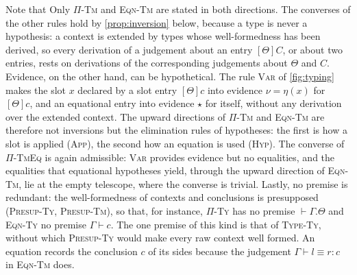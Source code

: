 Note that Only \textsc{$\Pi$-Tm} and \textsc{Eqn-Tm} are stated in both directions. The converses of the other rules hold by \cref{prop:inversion} below, because a type is never a hypothesis: a context is extended by types whose well-formedness has been derived, so every derivation of a judgement about an entry $[\Theta]C$, or about two entries, rests on derivations of the corresponding judgements about $\Theta$ and $C$. Evidence, on the other hand, can be hypothetical. The rule \textsc{Var} of \cref{fig:typing} makes the slot $x$ declared by a slot entry $[\Theta]c$ into evidence $\nu = \eta(x)$ for $[\Theta]c$, and an equational entry into evidence $\star$ for itself, without any derivation over the extended context. The upward directions of \textsc{$\Pi$-Tm} and \textsc{Eqn-Tm} are therefore not inversions but the elimination rules of hypotheses: the first is how a slot is applied (\textsc{App}), the second how an equation is used (\textsc{Hyp}). The converse of \textsc{$\Pi$-TmEq} is again admissible: \textsc{Var} provides evidence but no equalities, and the equalities that equational hypotheses yield, through the upward direction of \textsc{Eqn-Tm}, lie at the empty telescope, where the converse is trivial. Lastly, no premise is redundant: the well-formedness of contexts and conclusions is presupposed (\textsc{Presup-Ty}, \textsc{Presup-Tm}), so that, for instance, \textsc{$\Pi$-Ty} has no premise $\vdash \Gamma.\Theta$ and \textsc{Eqn-Ty} no premise $\Gamma \vdash c$. The one premise of this kind is that of \textsc{Type-Ty}, without which \textsc{Presup-Ty} would make every raw context well formed. An equation records the conclusion $c$ of its sides because the judgement $\Gamma \vdash l \equiv r : c$ in \textsc{Eqn-Tm} does.

